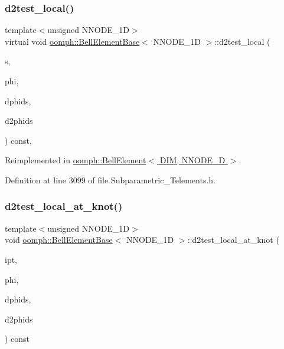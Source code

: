 \subsubsection{\texorpdfstring{d2test\+\_\+local()}{d2test\_local()}}
{\footnotesize\ttfamily template$<$unsigned N\+N\+O\+D\+E\+\_\+1D$>$ \\
virtual void \hyperlink{classoomph_1_1BellElementBase}{oomph\+::\+Bell\+Element\+Base}$<$ N\+N\+O\+D\+E\+\_\+1D $>$\+::d2test\+\_\+local (\begin{DoxyParamCaption}\item[{const \hyperlink{classoomph_1_1Vector}{Vector}$<$ double $>$ \&}]{s,  }\item[{\hyperlink{classoomph_1_1Shape}{Shape} \&}]{phi,  }\item[{\hyperlink{classoomph_1_1DShape}{D\+Shape} \&}]{dphids,  }\item[{\hyperlink{classoomph_1_1DShape}{D\+Shape} \&}]{d2phids }\end{DoxyParamCaption}) const\hspace{0.3cm}{\ttfamily [inline]}, {\ttfamily [virtual]}}



Reimplemented in \hyperlink{classoomph_1_1BellElement_a2d7e1df2f16e344721161ac2de099483}{oomph\+::\+Bell\+Element$<$ D\+I\+M, N\+N\+O\+D\+E\+\_\+D $>$}.



Definition at line 3099 of file Subparametric\+\_\+\+Telements.\+h.

\mbox{\label{classoomph_1_1BellElementBase_acad63d477784e6b88b92804b0f1b375e}} 
\subsubsection{\texorpdfstring{d2test\+\_\+local\+\_\+at\+\_\+knot()}{d2test\_local\_at\_knot()}}
{\footnotesize\ttfamily template$<$unsigned N\+N\+O\+D\+E\+\_\+1D$>$ \\
void \hyperlink{classoomph_1_1BellElementBase}{oomph\+::\+Bell\+Element\+Base}$<$ N\+N\+O\+D\+E\+\_\+1D $>$\+::d2test\+\_\+local\+\_\+at\+\_\+knot (\begin{DoxyParamCaption}\item[{const unsigned \&}]{ipt,  }\item[{\hyperlink{classoomph_1_1Shape}{Shape} \&}]{phi,  }\item[{\hyperlink{classoomph_1_1DShape}{D\+Shape} \&}]{dphids,  }\item[{\hyperlink{classoomph_1_1DShape}{D\+Shape} \&}]{d2phids }\end{DoxyParamCaption}) const\hspace{0.3cm}{\ttfamily [inline]}}

